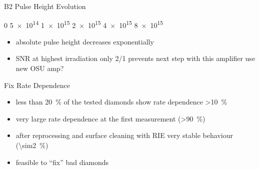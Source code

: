 \begin{frame}{B2 Pulse Height Evolution}

	\vspace*{-3ex}

	\def\d{\hspace*{1ex}}
	\hspace*{17ex} 0 \d\ra\d \SI{5e14}{} \d\ra\d \SI{1e15}{} \d\ra\d \SI{2e15}{} \ra \SI{4e15}{} \ra \SI{8e15}{\ncm}\vspace*{3ex}
	\begin{itemize}\itemfill
		\item absolute pulse height decreases exponentially
		\item SNR at highest irradiation only 2/1 \ra prevents next step with this amplifier \ra use new OSU amp?
	\end{itemize}

\end{frame}
\begin{frame}{Fix Rate Dependence}

	
	\begin{itemize}\itemfill
		\item less than \SI{20}{\%} of the tested diamonds show rate dependence \SI{>10}{\%}
		\item very large rate dependence at the first measurement (\SI{>90}{\%})
		\item after reprocessing and surface cleaning with RIE very stable behaviour (\SI{\sim2}{\%})
		\item feasible to ``fix'' bad diamonds
	\end{itemize}

\end{frame}
